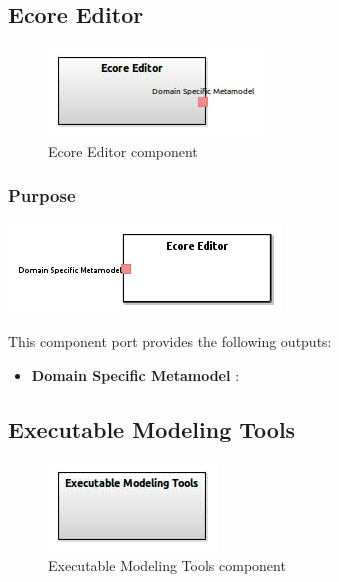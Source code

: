 \documentclass{gemoc} %
\begin{document}
\subsection{Ecore Editor}

\begin{figure}[htp]
	\begin{center}
	\includegraphics*[trim=0.0cm 0.0cm 0cm 0.0cm, clip=true, scale=1.0]{../images/generated/Generated_Ecore Editor.jpg}
	\caption{Ecore Editor component}
	\end{center}
\end{figure}

\subsubsection{Purpose}

\begin{center}
\includegraphics*[trim=0.0cm 0.0cm 0cm 0.0cm, clip=true]{../images/generated/Generated_Ecore_Editor.png}
\end{center}


This component port provides the following outputs:
\begin{itemize}
  \item \textbf{Domain Specific Metamodel} :
\end{itemize}

\subsection{Executable Modeling Tools}

\begin{figure}[htp]
	\begin{center}
	\includegraphics*[trim=0.0cm 0.0cm 0cm 0.0cm, clip=true, scale=1.0]{../images/generated/Generated_Executable Modeling Tools.jpg}
	\caption{Executable Modeling Tools component}
	\end{center}
\end{figure}
\end{document}
